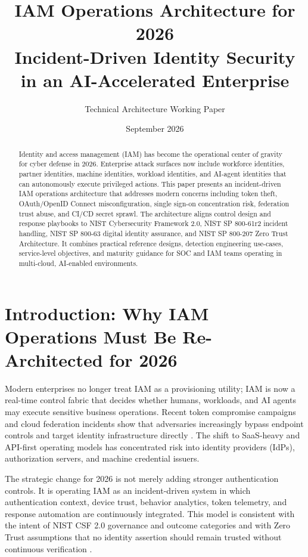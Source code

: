 \documentclass[11pt]{article}
\title{IAM Operations Architecture for 2026\\\large Incident-Driven Identity Security in an AI-Accelerated Enterprise}
\author{Technical Architecture Working Paper}
\date{September 2026}
\begin{document}
\maketitle

\begin{abstract}
Identity and access management (IAM) has become the operational center of gravity for cyber defense in 2026. Enterprise attack surfaces now include workforce identities, partner identities, machine identities, workload identities, and AI-agent identities that can autonomously execute privileged actions. This paper presents an incident-driven IAM operations architecture that addresses modern concerns including token theft, OAuth/OpenID Connect misconfiguration, single sign-on concentration risk, federation trust abuse, and CI/CD secret sprawl. The architecture aligns control design and response playbooks to NIST Cybersecurity Framework 2.0, NIST SP 800-61r2 incident handling, NIST SP 800-63 digital identity assurance, and NIST SP 800-207 Zero Trust Architecture. It combines practical reference designs, detection engineering use-cases, service-level objectives, and maturity guidance for SOC and IAM teams operating in multi-cloud, AI-enabled environments.
\end{abstract}

\tableofcontents
\newpage

\section{Introduction: Why IAM Operations Must Be Re-Architected for 2026}
Modern enterprises no longer treat IAM as a provisioning utility; IAM is now a real-time control fabric that decides whether humans, workloads, and AI agents may execute sensitive business operations. Recent token compromise campaigns and cloud federation incidents show that adversaries increasingly bypass endpoint controls and target identity infrastructure directly \cite{microsoft_storm0558,cisa_storm0558,okta_support_breach}. The shift to SaaS-heavy and API-first operating models has concentrated risk into identity providers (IdPs), authorization servers, and machine credential issuers.

The strategic change for 2026 is not merely adding stronger authentication controls. It is operating IAM as an incident-driven system in which authentication context, device trust, behavior analytics, token telemetry, and response automation are continuously integrated. This model is consistent with the intent of NIST CSF 2.0 governance and outcome categories \cite{nist_csf_2} and with Zero Trust assumptions that no identity assertion should remain trusted without continuous verification \cite{nist_800_207}.
\end{document}
